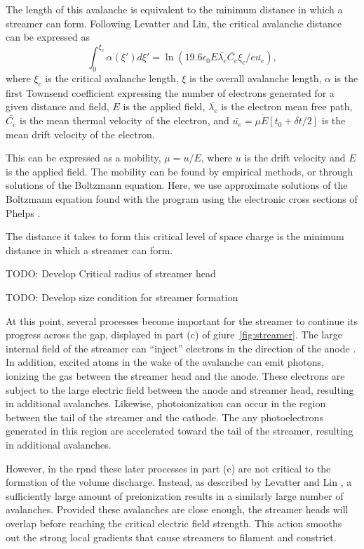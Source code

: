 The length of this avalanche is equivalent to the minimum distance in
which a streamer can form. Following Levatter and Lin, the critical
avalanche distance can be expressed as
\begin{equation}
  \int_0^{\xi_c}\alpha(\xi')d\xi' = \ln\left(19.6 \epsilon_0 E \bar{\lambda_e}
                                           \bar{C_e}\xi_c/e\bar{u_e}\right),
\end{equation}
where $\xi_c$ is the critical avalanche length, $\xi$ is the overall
avalanche length, $\alpha$ is the first Townsend coefficient expressing
the number of electrons generated for a given distance and field, $E$ is
the applied field, $\bar{\lambda_e}$ is the electron mean free path,
$\bar{C_e}$ is the mean thermal velocity of the electron, and $\bar{u_e}
= \mu\dot{E}[t_0+\delta t/2]$ is the mean drift velocity of the
electron.


This can be expressed as a mobility, $\mu = u/E$, where $u$ is the drift
velocity and $E$ is the applied field. The mobility can be found by
empirical methods, or through solutions of the Boltzmann equation. Here,
we use approximate solutions of the Boltzmann equation found with the
program  \cite{Hagelaar2005} using the electronic cross
sections of Phelps \cite{Phelps2002}.

The distance it takes to form this critical level of space charge is the
minimum distance in which a streamer can form.

TODO: Develop Critical radius of streamer head

TODO: Develop size condition for streamer formation

At this point, several processes become important for the streamer to
continue its progress across the gap, displayed in part (c) of
giure~\ref{fig:streamer}. The large internal field of the streamer can
``inject'' electrons in the direction of the anode \cite{Kunhardt1980}.
In addition, excited atoms in the wake of the avalanche can emit
photons, ionizing the gas between the streamer head and the anode. These
electrons are subject to the large electric field between the anode and
streamer head, resulting in additional avalanches. Likewise,
photoionization can occur in the region between the tail of the streamer
and the cathode. The any photoelectrons generated in this region are
accelerated toward the tail of the streamer, resulting in additional
avalanches.

However, in the \acs{rpnd} these later processes in part (c) are not
critical to the formation of the volume discharge. Instead, as described
by Levatter and Lin \cite{Levatter1980}, a sufficiently large amount of
preionization results in a similarly large number of avalanches.
Provided these avalanches are close enough, the streamer heads will
overlap before reaching the critical electric field strength. This
action smooths out the strong local gradients that cause streamers to
filament and constrict.

